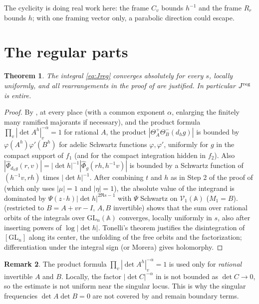 \documentclass[11pt,oneside,notitlepage]{book}
\numberwithin{equation}{section}
\theoremstyle{plain}
\newtheorem{theorem}{Theorem}[section]
\theoremstyle{definition}
\newtheorem{remark}[theorem]{Remark}
\newcommand{\A}{\mathbb{A}}
\newcommand{\GL}{\mathrm{GL}}
\begin{document}
The cyclicity is doing real work here: the frame $C_v$ bounds $h^{-1}$ and the frame $R_r$ bounds $h$; with one framing vector only, a parabolic direction could escape.

\section{The regular parts}

\begin{theorem}\label{thm:A-regular}
The integral \eqref{eq:Jreg} converges absolutely for every $s$, locally uniformly, and all rearrangements in the proof of  are justified. In particular $J^{\rm reg}$ is entire.
\end{theorem}
\begin{proof}
By ,  at every place (with a common exponent $\alpha$, enlarging the finitely many ramified majorants if necessary), and the product formula $\prod_v|\det A^h|_v^{-\alpha}=1$ for rational $A$, the product $|\Theta^+_A\Theta^-_B(d_hg)|$ is bounded by $\varphi(A^h)\varphi'(B^h)$ for adelic Schwartz functions $\varphi,\varphi'$, uniformly for $g$ in the compact support of $f_1$ (and for the compact integration hidden in $f_2$). Also $|\widehat\Phi_{d_hg}(r,v)|=|\det h|^{-1}|\widehat\Phi_g(rh,h^{-1}v)|$ is bounded by a Schwartz function of $(h^{-1}v,rh)$ times $|\det h|^{-1}$. After combining $t$ and $h$ as in Step 2 of the proof of  (which only uses $|\mu|=1$ and $|\eta|=1$), the absolute value of the integrand is dominated by $\Psi(z\cdot h)|\det h|^{2\Re s-1}$ with $\Psi$ Schwartz on $\mathcal V_1(\A)$ ($M_1=B$).  (restricted to $B=A+vr-I$, $A,B$ invertible) shows that the sum over rational orbits of the integrals over $\GL_n(\A)$ converges, locally uniformly in $s$, also after inserting powers of $\log|\det h|$. Tonelli's theorem justifies the disintegration of $[\GL_n]$ along its center, the unfolding of the free orbits and the factorization; differentiation under the integral sign (or Morera) gives holomorphy.
\end{proof}

\begin{remark}
The product formula $\prod_v|\det A^h|_v^{-\alpha}=1$ is used only for \emph{rational} invertible $A$ and $B$. Locally, the factor $|\det C|^{-\alpha}$ in  is not bounded as $\det C\to0$, so the estimate is not uniform near the singular locus. This is why the singular frequencies $\det A\det B=0$ are not covered by  and remain boundary terms.
\end{remark}
\end{document}
